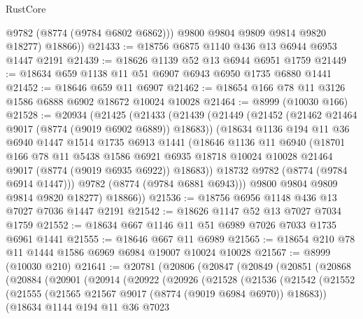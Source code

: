 \begin{lexlean}{RustCore}
\begin{coremodule}
            @9782
            (@8774 (@9784 @6802 @6862)))
          @9800
          @9804
          @9809
          @9814
          @9820
          @18277)
        @18866))
@21433 := @18756 @6875 @1140 @436 @13 @6944 @6953 @1447 @2191
@21439 := @18626 @1139 @52 @13 @6944 @6951 @1759
@21449 := @18634 @659 @1138 @11 @51 @6907 @6943 @6950 @1735 @6880 @1441
@21452 := @18646 @659 @11 @6907
@21462 := @18654 @166 @78 @11 @3126 @1586 @6888 @6902 @18672 @10024 @10028
@21464 := @8999 (@10030 @166)
@21528 := @20934
    (@21425
      (@21433
        (@21439
          (@21449
            (@21452 (@21462 @21464 @9017 (@8774 (@9019 @6902 @6889)) @18683))
            (@18634
              @1136
              @194
              @11
              @36
              @6940
              @1447
              @1514
              @1735
              @6913
              @1441
              (@18646
                @1136
                @11
                @6940
                (@18701
                  @166
                  @78
                  @11
                  @5438
                  @1586
                  @6921
                  @6935
                  @18718
                  @10024
                  @10028
                  @21464
                  @9017
                  (@8774 (@9019 @6935 @6922))
                  @18683))
              @18732
              @9782
              (@8774 (@9784 @6914 @1447)))
            @9782
            (@8774 (@9784 @6881 @6943)))
          @9800
          @9804
          @9809
          @9814
          @9820
          @18277)
        @18866))
@21536 := @18756 @6956 @1148 @436 @13 @7027 @7036 @1447 @2191
@21542 := @18626 @1147 @52 @13 @7027 @7034 @1759
@21552 := @18634 @667 @1146 @11 @51 @6989 @7026 @7033 @1735 @6961 @1441
@21555 := @18646 @667 @11 @6989
@21565 := @18654 @210 @78 @11 @1444 @1586 @6969 @6984 @19007 @10024 @10028
@21567 := @8999 (@10030 @210)
@21641 := @20781
    (@20806
      (@20847
        (@20849
          (@20851
            (@20868
              (@20884
                (@20901
                  (@20914
                    (@20922
                      (@20926
                        (@21528
                          (@21536
                            (@21542
                              (@21552
                                (@21555 (@21565 @21567 @9017 (@8774 (@9019 @6984 @6970)) @18683))
                                (@18634
                                  @1144
                                  @194
                                  @11
                                  @36
                                  @7023

\end{coremodule}
\end{lexlean}
